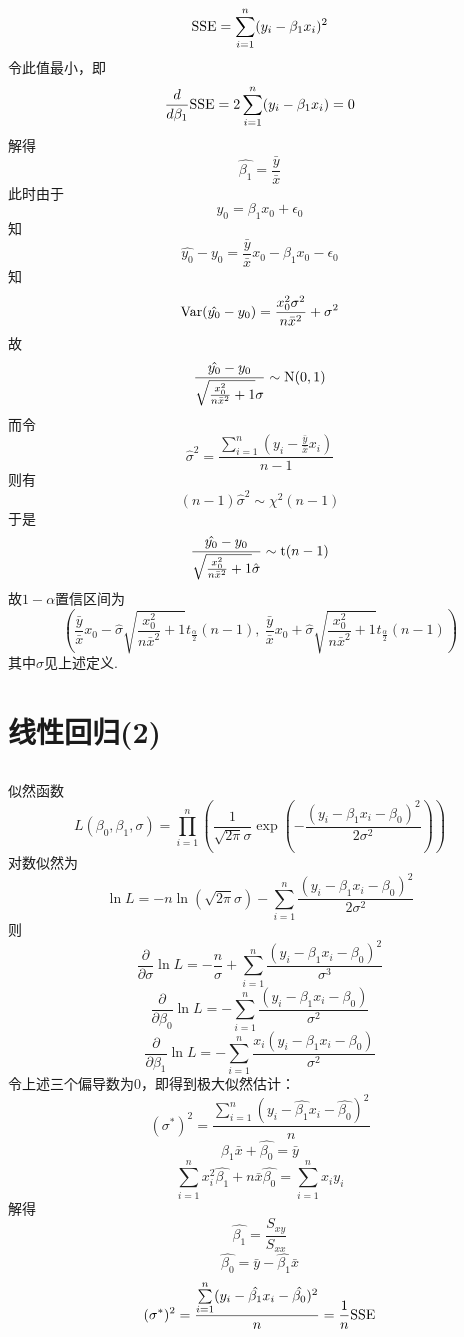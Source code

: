 \documentclass{article}
\begin{document}
\begin{CJK}{UTF8}{gbsn}
\subsection{}
$$ {\rm SSE}=\sum\limits_{i=1}^{n}(y_{i}-\beta_{1}x_{i})^{2}$$
令此值最小，即
$$ \frac{d}{d\beta_{1}} {\rm SSE}=2\sum\limits_{i=1}^{n}(y_{i}-\beta_{1}x_{i})=0 $$
解得
$$ \hat{\beta_{1}}=\frac{\bar{y}}{\bar{x}} $$
此时由于
$$ y_{0}=\beta_{1}x_{0}+\epsilon_{0} $$
知
$$ \hat{y_{0}}-y_{0}=\frac{\bar{y}}{\bar{x}}x_{0}-\beta_{1}x_{0}-\epsilon_{0} $$
知
$$ {\rm Var}(\hat{y_{0}}-y_{0})=\frac{x_{0}^{2}\sigma^{2}}{n\bar{x}^{2}}+\sigma^{2} $$
故
$$ \frac{\hat{y_{0}}-y_{0}}{\sqrt{\frac{x_{0}^{2}}{n\bar{x}^{2}}+1}\sigma}\sim{\rm N}(0,1) $$
而令
$$ \hat{\sigma}^{2}=\frac{\sum\limits_{i=1}^{n}(y_{i}-\frac{\bar{y}}{\bar{x}}x_{i})}{n-1} $$
则有
$$ (n-1)\hat{\sigma}^{2}\sim\chi^{2}(n-1)$$
于是
$$ \frac{\hat{y_{0}}-y_{0}}{\sqrt{\frac{x_{0}^{2}}{n\bar{x}^{2}}+1}\hat{\sigma}}\sim{\rm t}(n-1) $$
故$1-\alpha$置信区间为
$$ (\frac{\bar{y}}{\bar{x}}x_{0}-\hat{\sigma}\sqrt{\frac{x_{0}^{2}}{n\bar{x}^{2}}+1}t_{\frac{\alpha}{2}}(n-1),\ \frac{\bar{y}}{\bar{x}}x_{0}+\hat{\sigma}\sqrt{\frac{x_{0}^{2}}{n\bar{x}^{2}}+1}t_{\frac{\alpha}{2}}(n-1))$$
其中$\hat{\sigma}$见上述定义.
\section{线性回归(2)}
\subsection{}
似然函数
$$ L(\beta_{0},\beta_{1},\sigma)=\prod\limits_{i=1}^{n}(\frac{1}{\sqrt{2\pi}\sigma}\exp(-\frac{(y_{i}-\beta_{1}x_{i}-\beta_{0})^{2}}{2\sigma^{2}}))$$
对数似然为
$$ \ln L=-n\ln(\sqrt{2\pi}\sigma)-\sum\limits_{i=1}^{n}\frac{(y_{i}-\beta_{1}x_{i}-\beta_{0})^{2}}{2\sigma^{2}}$$
则
$$ \frac{\partial}{\partial\sigma}\ln L=-\frac{n}{\sigma}+\sum\limits_{i=1}^{n}\frac{(y_{i}-\beta_{1}x_{i}-\beta_{0})^{2}}{\sigma^{3}}$$
$$ \frac{\partial}{\partial\beta_{0}}\ln L=-\sum\limits_{i=1}^{n}\frac{(y_{i}-\beta_{1}x_{i}-\beta_{0})}{\sigma^{2}}$$
$$ \frac{\partial}{\partial\beta_{1}}\ln L=-\sum\limits_{i=1}^{n}\frac{x_{i}(y_{i}-\beta_{1}x_{i}-\beta_{0})}{\sigma^{2}}$$
令上述三个偏导数为0，即得到极大似然估计：
$$ (\sigma^{*})^{2}=\frac{\sum\limits_{i=1}^{n}(y_{i}-\hat{\beta_{1}}x_{i}-\hat{\beta_{0}})^{2}}{n} $$
$$ \hat\beta_{1}\bar{x}+\hat{\beta_{0}}=\bar{y} $$
$$ \sum\limits_{i=1}^{n}x_{i}^{2}\hat{\beta_{1}}+n\bar{x}\hat{\beta_{0}}=\sum\limits_{i=1}^{n}x_{i}y_{i} $$
解得
$$ \hat{\beta_{1}}=\frac{S_{xy}}{S_{xx}} $$
$$ \hat{\beta_{0}}=\bar{y}-\hat{\beta_{1}}\bar{x} $$
$$ (\sigma^{*})^{2}=\frac{\sum\limits_{i=1}^{n}(y_{i}-\hat{\beta_{1}}x_{i}-\hat{\beta_{0}})^{2}}{n}=\frac{1}{n}{\rm SSE}$$

\end{CJK}
\end{document}

